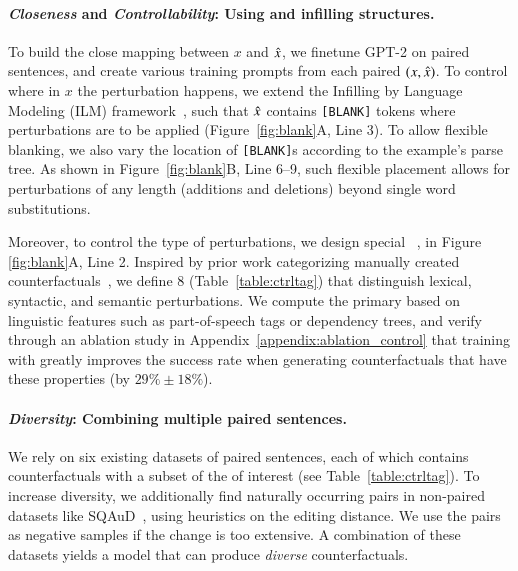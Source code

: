 \TagTable

\paragraph{\emph{Closeness} and \emph{Controllability}: Using \tagstrs and infilling structures.}
To build the close mapping between $x$ and $\hat{x}$, we finetune GPT-2 on paired sentences, and create various training prompts from each paired $(x, \hat{x})$.
To control where in $x$ the perturbation happens, we extend the Infilling by Language Modeling (ILM) framework~\cite{donahue2020enabling}, such that $\hat{x}$ contains \texttt{[BLANK]} tokens where perturbations are to be applied (Figure~\ref{fig:blank}A, Line 3). 
To allow flexible blanking, we also vary the location of \texttt{[BLANK]}s according to the example's parse tree.
As shown in Figure~\ref{fig:blank}B, Line 6--9, such flexible placement allows for perturbations of any length (additions and deletions) beyond single word substitutions.


Moreover, to control the type of perturbations, we design special \tagstrs~\cite{raffel2019exploring, Dathathri2020Plug}, \eg {} in Figure \ref{fig:blank}A, Line 2.
Inspired by prior work categorizing manually created counterfactuals~\cite{kaushik2019learning, gardner2020contrast}, we define 8 \tagstrshorts (Table~\ref{table:ctrltag}) that distinguish lexical, syntactic, and semantic perturbations.
We compute the primary \tagstrshort based on linguistic features such as part-of-speech tags or dependency trees, and verify through an ablation study in Appendix~\ref{appendix:ablation_control} that training \sysname with \tagstrs greatly improves the success rate when generating counterfactuals that have these properties (by $29\% \pm 18\%$).

\paragraph{\emph{Diversity}: Combining multiple paired sentences.}
We rely on six existing datasets of paired sentences, each of which contains counterfactuals with a subset of the \tagstrs of interest (see Table~\ref{table:ctrltag}). 
To increase diversity, we additionally find naturally occurring pairs in non-paired datasets like SQAuD~\cite{rajpurkar-etal-2016-squad}, using heuristics on the editing distance. 
We use the pairs as negative samples if the change is too extensive.
A combination of these datasets yields a model that can produce \emph{diverse} counterfactuals.

